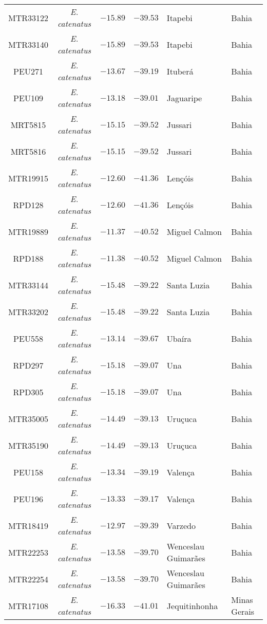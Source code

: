 \begin{longtable}{cc>{\centering\arraybackslash}p{100px}>{\centering\arraybackslash}p{100px}>{\centering\arraybackslash}p{100px}>{\centering\arraybackslash}p{100px}}
MTR33122 & \emph{E. catenatus} & $-15.89$ & $-39.53$ & Itapebi & Bahia \\ 
MTR33140 & \emph{E. catenatus} & $-15.89$ & $-39.53$ & Itapebi & Bahia \\ 
PEU271 & \emph{E. catenatus} & $-13.67$ & $-39.19$ & Ituberá & Bahia \\ 
PEU109 & \emph{E. catenatus} & $-13.18$ & $-39.01$ & Jaguaripe & Bahia \\ 
MRT5815 & \emph{E. catenatus} & $-15.15$ & $-39.52$ & Jussari & Bahia \\ 
MRT5816 & \emph{E. catenatus} & $-15.15$ & $-39.52$ & Jussari & Bahia \\ 
MTR19915 & \emph{E. catenatus} & $-12.60$ & $-41.36$ & Lençóis & Bahia \\ 
RPD128 & \emph{E. catenatus} & $-12.60$ & $-41.36$ & Lençóis & Bahia \\ 
MTR19889 & \emph{E. catenatus} & $-11.37$ & $-40.52$ & Miguel Calmon & Bahia \\ 
RPD188 & \emph{E. catenatus} & $-11.38$ & $-40.52$ & Miguel Calmon & Bahia \\ 
MTR33144 & \emph{E. catenatus} & $-15.48$ & $-39.22$ & Santa Luzia & Bahia \\ 
MTR33202 & \emph{E. catenatus} & $-15.48$ & $-39.22$ & Santa Luzia & Bahia \\ 
PEU558 & \emph{E. catenatus} & $-13.14$ & $-39.67$ & Ubaíra & Bahia \\ 
RPD297 & \emph{E. catenatus} & $-15.18$ & $-39.07$ & Una & Bahia \\ 
RPD305 & \emph{E. catenatus} & $-15.18$ & $-39.07$ & Una & Bahia \\ 
MTR35005 & \emph{E. catenatus} & $-14.49$ & $-39.13$ & Uruçuca & Bahia \\ 
MTR35190 & \emph{E. catenatus} & $-14.49$ & $-39.13$ & Uruçuca & Bahia \\ 
PEU158 & \emph{E. catenatus} & $-13.34$ & $-39.19$ & Valença & Bahia \\ 
PEU196 & \emph{E. catenatus} & $-13.33$ & $-39.17$ & Valença & Bahia \\ 
MTR18419 & \emph{E. catenatus} & $-12.97$ & $-39.39$ & Varzedo & Bahia \\ 
MTR22253 & \emph{E. catenatus} & $-13.58$ & $-39.70$ & Wenceslau Guimarães & Bahia \\ 
MTR22254 & \emph{E. catenatus} & $-13.58$ & $-39.70$ & Wenceslau Guimarães & Bahia \\ 
MTR17108 & \emph{E. catenatus} & $-16.33$ & $-41.01$ & Jequitinhonha & Minas Gerais \\ 

\end{longtable}
